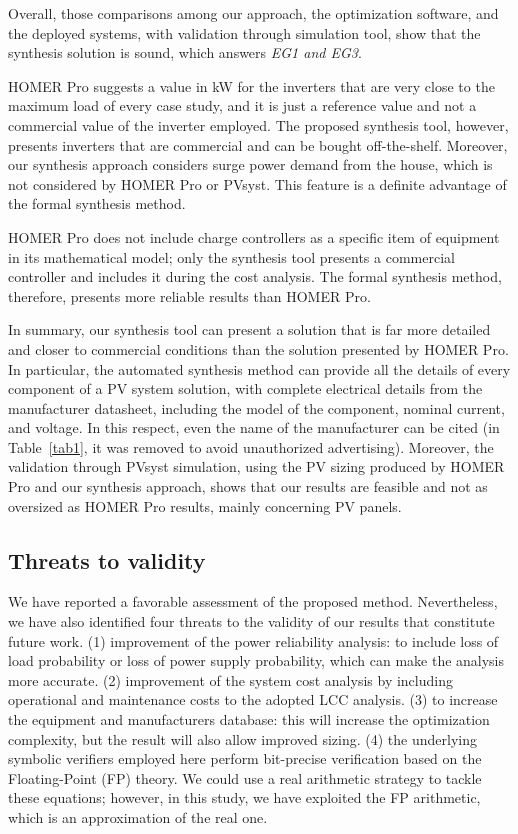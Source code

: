 \documentclass[runningheads]{llncs}
\begin{document}
Overall, those comparisons among our approach, the optimization software, and the deployed systems, with validation through simulation tool, show that the synthesis solution is sound, which answers \textit{EG1 and EG3}.

HOMER Pro suggests a value in kW for the inverters that are very close to the maximum load of every case study, and it is just a reference value and not a commercial value of the inverter employed. The proposed synthesis tool, however, presents inverters that are commercial and can be bought off-the-shelf. Moreover, our synthesis approach considers surge power demand from the house, which is not considered by HOMER Pro or PVsyst. This feature is a definite advantage of the formal synthesis method.

HOMER Pro does not include charge controllers as a specific item of equipment in its mathematical model; only the synthesis tool presents a commercial controller and includes it during the cost analysis. The formal synthesis method, therefore, presents more reliable results than HOMER Pro.

In summary, our synthesis tool can present a solution that is far more detailed and closer to commercial conditions than the solution presented by HOMER Pro. In particular, the automated synthesis method can provide all the details of every component of a PV system solution, with complete electrical details from the manufacturer datasheet, including the model of the component, nominal current, and voltage. In this respect, even the name of the manufacturer can be cited (in Table~\ref{tab1}, it was removed to avoid unauthorized advertising). Moreover, the validation through PVsyst simulation, using the PV sizing produced by HOMER Pro and our synthesis approach, shows that our results are feasible and not as oversized as HOMER Pro results, mainly concerning PV panels.

\subsection{Threats to validity} 

We have reported a favorable assessment of the proposed method. Nevertheless, we have also identified four threats to the validity of our results that constitute future work. (1) improvement of the power reliability analysis: to include loss of load probability or loss of power supply probability, which can make the analysis more accurate. (2) improvement of the system cost analysis by including operational and maintenance costs to the adopted LCC analysis. (3) to increase the equipment and manufacturers database: this will increase the optimization complexity, but the result will also allow improved sizing. (4) the underlying symbolic verifiers employed here perform bit-precise verification based on the Floating-Point (FP) theory. We could use a real arithmetic strategy to tackle these equations; however, in this study, we have exploited the FP arithmetic, which is an approximation of the real one. 
\end{document}

